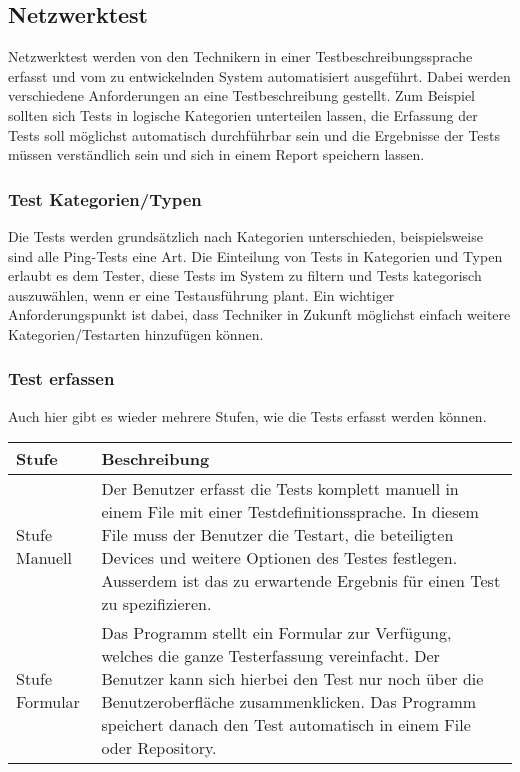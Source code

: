 \documentclass[
	ngerman,
	toc=listof, %
	toc=bibliography, %
	footnotes=multiple, %
	parskip=half, %
	numbers=noendperiod %
]{scrartcl}
\begin{document}
	\subsection{Netzwerktest}
		Netzwerktest werden von den Technikern in einer Testbeschreibungssprache erfasst und vom zu entwickelnden System automatisiert ausgeführt.
		Dabei werden verschiedene Anforderungen an eine Testbeschreibung gestellt. Zum Beispiel sollten sich Tests in logische Kategorien unterteilen lassen, die Erfassung der Tests soll möglichst automatisch durchführbar sein und die Ergebnisse der Tests müssen verständlich sein und sich in einem Report speichern lassen.

		
		\subsubsection{Test Kategorien/Typen}
			Die Tests werden grundsätzlich nach Kategorien unterschieden, beispielsweise sind alle Ping-Tests eine Art.
			Die Einteilung von Tests in Kategorien und Typen erlaubt es dem Tester, diese Tests im System zu filtern und Tests kategorisch auszuwählen, wenn er eine Testausführung plant.
			Ein wichtiger Anforderungspunkt ist dabei, dass Techniker in Zukunft möglichst einfach weitere Kategorien/Testarten hinzufügen können.

		\subsubsection{Test erfassen}
			Auch hier gibt es wieder mehrere Stufen, wie die Tests erfasst werden können.\\

			\begin{tabularx}{\textwidth}{lX}
				\toprule
				Stufe & Beschreibung\\
				\midrule
				Stufe Manuell & Der Benutzer erfasst die Tests komplett manuell in einem File mit einer Testdefinitionssprache. In diesem File muss der Benutzer die Testart, die beteiligten Devices und weitere Optionen des Testes festlegen. Ausserdem ist das zu erwartende Ergebnis für einen Test zu spezifizieren. \\
				\midrule
				Stufe Formular & Das Programm stellt ein Formular zur Verfügung, welches die ganze Testerfassung vereinfacht. Der Benutzer kann sich hierbei den Test nur noch über die Benutzeroberfläche zusammenklicken. Das Programm speichert danach den Test automatisch in einem File oder Repository. \\
				\bottomrule
			\end{tabularx}
\end{document}
